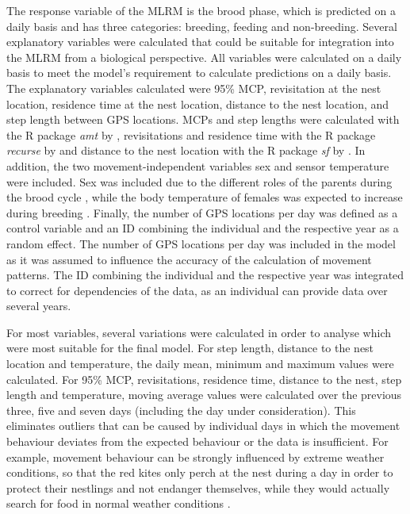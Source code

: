 The response variable of the MLRM is the brood phase, which is predicted on a daily basis and has three categories: breeding, feeding and non-breeding. Several explanatory variables were calculated that could be suitable for integration into the MLRM from a biological perspective. All variables were calculated on a daily basis to meet the model's requirement to calculate predictions on a daily basis. The explanatory variables calculated were 95\% MCP, revisitation at the nest location, residence time at the nest location, distance to the nest location, and step length between GPS locations. MCPs and step lengths were calculated with the R package \textit{amt} by \textcite{signer2019amt}, revisitations and residence time with the R package \textit{recurse} by \textcite{bracis2018revisit} and distance to the nest location with the R package \textit{sf} by \textcite{pebesma2018simple}. In addition, the two movement-independent variables sex and sensor temperature were included. Sex was included due to the different roles of the parents during the brood cycle \parencite{spatz2021zwischen}, while the body temperature of females was expected to increase during breeding \parencite{aebischer2021rotmilan}. Finally, the number of GPS locations per day was defined as a control variable and an ID combining the individual and the respective year as a random effect. The number of GPS locations per day was included in the model as it was assumed to influence the accuracy of the calculation of movement patterns. The ID combining the individual and the respective year was integrated to correct for dependencies of the data, as an individual can provide data over several years.

For most variables, several variations were calculated in order to analyse which were most suitable for the final model. For step length, distance to the nest location and temperature, the daily mean, minimum and maximum values were calculated. For 95\% MCP, revisitations, residence time, distance to the nest, step length and temperature, moving average values were calculated over the previous three, five and seven days (including the day under consideration). This eliminates outliers that can be caused by individual days in which the movement behaviour deviates from the expected behaviour or the data is insufficient. For example, movement behaviour can be strongly influenced by extreme weather conditions, so that the red kites only perch at the nest during a day in order to protect their nestlings and not endanger themselves, while they would actually search for food in normal weather conditions \parencite{aebischer2021rotmilan}.

